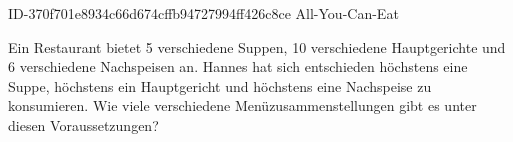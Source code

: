 \begin{exercise}
      {ID-370f701e8934c66d674cffb94727994ff426c8ce}
      {All-You-Can-Eat}
  \ifproblem\problem\par
    Ein Restaurant bietet 5 verschiedene Suppen, 10 verschiedene Hauptgerichte
    und 6 verschiedene Nachspeisen an. Hannes hat sich entschieden höchstens
    eine Suppe, höchstens ein Hauptgericht und höchstens eine Nachspeise zu
    konsumieren. Wie viele verschiedene Menüzusammenstellungen gibt es unter
    diesen Voraussetzungen?
  \fi
\end{exercise}
